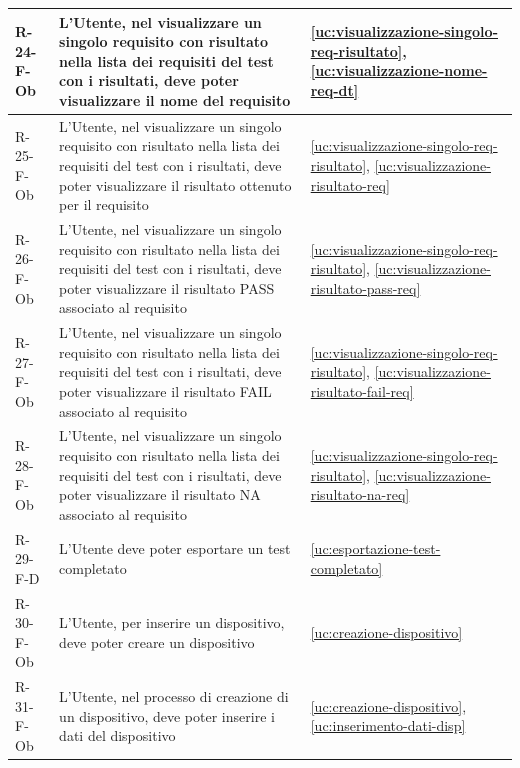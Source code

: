 ﻿\documentclass[a4paper,12pt]{article}
\begin{document}
{{\begin{longtable}{|l|p{}|p{}|}
            R-24-F-Ob       & L'Utente, nel visualizzare un singolo requisito con risultato nella lista dei requisiti del test con i risultati, deve poter visualizzare il nome del requisito                             & \ref{uc:visualizzazione-singolo-req-risultato}, \ref{uc:visualizzazione-nome-req-dt}         \\ \hline
            R-25-F-Ob       & L'Utente, nel visualizzare un singolo requisito con risultato nella lista dei requisiti del test con i risultati, deve poter visualizzare il risultato ottenuto per il requisito            & \ref{uc:visualizzazione-singolo-req-risultato}, \ref{uc:visualizzazione-risultato-req} \\ \hline
            R-26-F-Ob       & L'Utente, nel visualizzare un singolo requisito con risultato nella lista dei requisiti del test con i risultati, deve poter visualizzare il risultato PASS associato al requisito            & \ref{uc:visualizzazione-singolo-req-risultato}, \ref{uc:visualizzazione-risultato-pass-req} \\ \hline
            R-27-F-Ob       & L'Utente, nel visualizzare un singolo requisito con risultato nella lista dei requisiti del test con i risultati, deve poter visualizzare il risultato FAIL associato al requisito       & \ref{uc:visualizzazione-singolo-req-risultato}, \ref{uc:visualizzazione-risultato-fail-req} \\ \hline
            R-28-F-Ob       & L'Utente, nel visualizzare un singolo requisito con risultato nella lista dei requisiti del test con i risultati, deve poter visualizzare il risultato NA associato al requisito         & \ref{uc:visualizzazione-singolo-req-risultato}, \ref{uc:visualizzazione-risultato-na-req} \\ \hline
            R-29-F-D        & L'Utente deve poter esportare un test completato                                                                                                                                            & \ref{uc:esportazione-test-completato}                                               \\ \hline
            R-30-F-Ob       & L'Utente, per inserire un dispositivo, deve poter creare un dispositivo                                                                                                                     & \ref{uc:creazione-dispositivo}                                               \\ \hline
            R-31-F-Ob       & L'Utente, nel processo di creazione di un dispositivo, deve poter inserire i dati del dispositivo                                                                                           & \ref{uc:creazione-dispositivo}, \ref{uc:inserimento-dati-disp}                 \\ \hline

\end{longtable}}}
\end{document}
